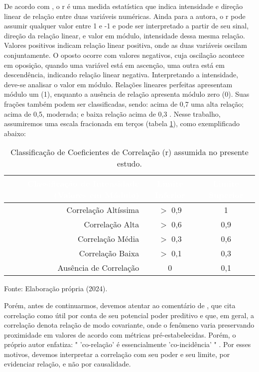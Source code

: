 \documentclass[
	12pt,				%
	openright,			%
	oneside,			%
	a4paper,			%
	english,			%
	french,				%
	spanish,			%
	brazil				%
	dvipsnames, table]{abntex2}
\begin{document}
\indent De acordo com , o \acrfull{r} é uma medida estatística que indica intensidade e direção linear de relação entre duas variáveis numéricas. Ainda para a autora, o \acrlong{r} pode assumir qualquer valor entre 1 e -1 e pode ser interpretado a partir de seu sinal, direção da relação linear, e valor em módulo, intensidade dessa mesma relação.
Valores positivos indicam relação linear positiva, onde as duas variáveis oscilam conjuntamente. O oposto ocorre com valores negativos, cuja oscilação acontece em oposição, quando uma variável está em ascenção, uma outra está em descendência, indicando relação linear negativa. Interpretando a intensidade, deve-se analisar o valor em módulo. Relações lineares perfeitas apresentam módulo um (1), enquanto a ausência de relação apresenta módulo zero (0). Suas frações também podem ser classificadas, sendo: acima de 0,7 uma alta relação; acima de 0,5, moderada; e baixa relação acima de 0,3 \cite{StatsDummies}. Nesse trabalho, assumiremos uma escala fracionada em terços (tabela \ref{tab:class_corr}), como exemplificado abaixo:

\begin{table}[htbp]
    \begin{center}
    \caption{Classificação de Coeficientes de Correlação (r) assumida no presente estudo.}
    {
    \begin{tabular}{r|cc}
    \hline
    \toprule
    \rowcolor{darkgray} \textcolor{white}{Classificação de Intensidade (Valores em Módulo)} & \textcolor{white}{Limite Inferior} & \textcolor{white}{Limite Superior}\\
    \midrule
    Correlação Altíssima & $>$ 0,9 & 1\\
    Correlação Alta & $>$  0,6 & 0,9\\
    Correlação Média & $>$  0,3 & 0,6\\
    Correlação Baixa & $>$  0,1 & 0,3\\
    Ausência de Correlação & 0 & 0,1\\
    \bottomrule
    \end{tabular}}
    \label{tab:class_corr}
    \end{center}
    \small{Fonte: Elaboração própria (2024).}
\end{table}

\indent Porém, antes de continuarmos, devemos atentar ao comentário de , que cita correlação como útil por conta de seu potencial poder preditivo e que, em geral, a correlação denota relação de modo covariante, onde o fenômeno varia preservando proximidade em valores de acordo com métricas pré-estabelecidas. Porém, o próprio autor enfatiza: " 'co-relação' é essencialmente 'co-incidência' " \cite{espurioCorr}. Por esses motivos, devemos interpretar a correlação com seu poder e seu limite, por evidenciar relação, e não por causalidade.
\end{document}
